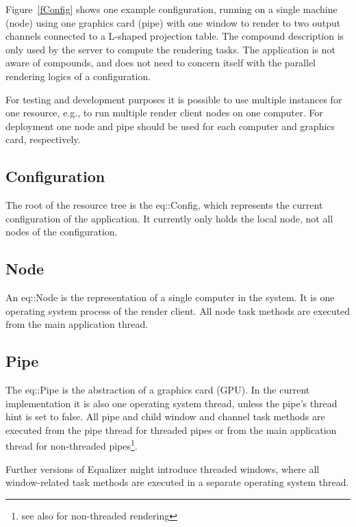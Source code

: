\documentclass[10pt,a4]{scrartcl}
\newcommand{\fig}[1]{Figure~\ref{#1}}
\begin{document}
\fig{fConfig} shows one example configuration, running on a single
machine (node) using one graphics card (pipe) with one window to render
to two output channels connected to a L-shaped projection table. The
compound description is only used by the server to compute the rendering
tasks. The application is not aware of compounds, and does not need to
concern itself with the parallel rendering logics of a configuration.

For testing and development purposes it is possible to use multiple
instances for one resource, e.g., to run multiple render client nodes on
one computer. For deployment one node and pipe should be used for each
computer and graphics card, respectively.

\subsection{Configuration}

The root of the resource tree is the \textsf{eq::Config}, which
represents the current configuration of the application. It currently
only holds the local node, not all nodes of the configuration.

\subsection{Node}

An \textsf{eq::Node} is the representation of a single computer in the
system. It is one operating system process of the render client. All
node task methods are executed from the main application thread.

\subsection{Pipe}

The \textsf{eq::Pipe} is the abstraction of a graphics card (GPU). In
the current implementation it is also one operating system thread,
unless the pipe's thread hint is set to \textsf{false}. All pipe and
child window and channel task methods are executed from the pipe thread
for threaded pipes or from the main application thread for non-threaded
pipes\footnote{see also
  for non-threaded rendering}.

Further versions of Equalizer might introduce threaded windows, where
all window-related task methods are executed in a separate operating
system thread.
\end{document}
